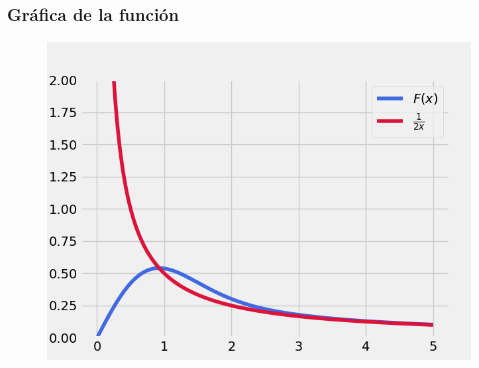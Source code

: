 \documentclass{article}
\begin{document}
\begin{tcolorbox}[breakable]
    \subsubsection*{Gráfica de la función}
    \begin{figure}[H]
        \centering
        \includegraphics[scale=0.6]{images/p2_grafica.png}
    \end{figure}
\end{tcolorbox}
\end{document}
